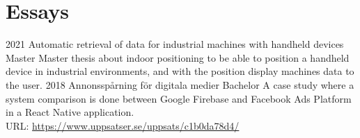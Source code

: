 \section{Essays}



\begin{entrylist}
  \entry
    {2021}
    {Automatic retrieval of data for industrial machines with handheld devices}
    {Master}
    {%
    Master thesis about indoor positioning to be able to position a handheld device in industrial environments, and with the position display machines data to the user.
    }
  \entry
    {2018}
    {Annonsspårning för digitala medier}
    {Bachelor}
    {%
      A case study where a system comparison is done between Google Firebase and Facebook Ads Platform in a React Native application. \\URL: \href{https://www.uppsatser.se/uppsats/c1b0da78d4/}{https://www.uppsatser.se/uppsats/c1b0da78d4/}
      }
\end{entrylist}
